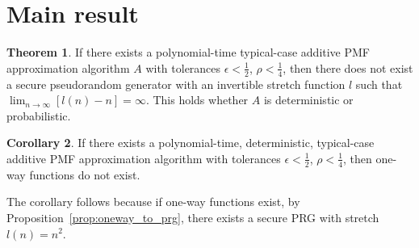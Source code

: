 \documentclass{article}
\theoremstyle{definition}
\newtheorem{defn}{Definition}
\newtheorem{thm}{Theorem}
\newtheorem{cor}[thm]{Corollary}
\theoremstyle{remark}
\begin{document}
\section{Main result}

\begin{thm} \label{thm:main}
If there exists a polynomial-time typical-case additive PMF approximation algorithm $A$ with tolerances $\epsilon < \frac{1}{2}$, $\rho < \frac{1}{4}$,
then there does not exist a secure pseudorandom generator with an invertible stretch function $l$ such that $\lim_{n \to \infty}[l(n) - n] = \infty$.
This holds whether $A$ is deterministic or probabilistic.
\end{thm}

\begin{cor}
If there exists a polynomial-time, deterministic, typical-case additive PMF approximation algorithm with tolerances $\epsilon < \frac{1}{2}$, $\rho < \frac{1}{4}$,
then one-way functions do not exist.
\end{cor}
\noindent The corollary follows because if one-way functions exist, by Proposition~\ref{prop:oneway_to_prg}, there exists a secure PRG with stretch $l(n) = n^2$.
\end{document}
